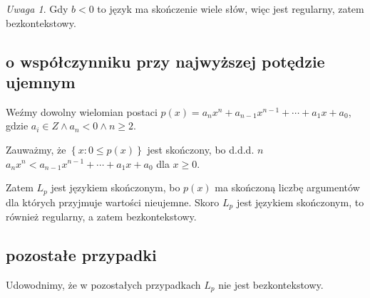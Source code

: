 \documentclass{article}
\theoremstyle{definition}
\theoremstyle{remark}
\newtheorem*{remark}{Uwaga}
\begin{document}
\begin{remark}
Gdy \(b < 0\) to język ma skończenie wiele słów, więc jest regularny, zatem bezkontekstowy.
\end{remark}

\subsection{o współczynniku przy najwyższej potędzie ujemnym}

Weźmy dowolny wielomian postaci \( p(x)=a_n x^n + a_{n-1}x^{n-1} + \cdots + a_1x + a_0\), gdzie \(a_i \in Z \land a_n < 0 \land n \geq 2\).

Zauważmy, że \(\left\{ x: 0 \leq p(x) \right\}\) jest skończony, bo d.d.d. \(n\) \(a_n x^n < a_{n-1}x^{n-1} + \cdots + a_1x + a_0\) dla \(x \geq 0\).

Zatem \(L_p\) jest językiem skończonym, bo \(p(x)\) ma skończoną liczbę argumentów
dla których przyjmuje wartości nieujemne.
Skoro \(L_p\) jest językiem skończonym, to również regularny, a zatem bezkontekstowy.

\subsection{pozostałe przypadki}\label{sec:a:remaining}

Udowodnimy, że w pozostałych przypadkach \(L_p\) nie jest bezkontekstowy.
\end{document}
